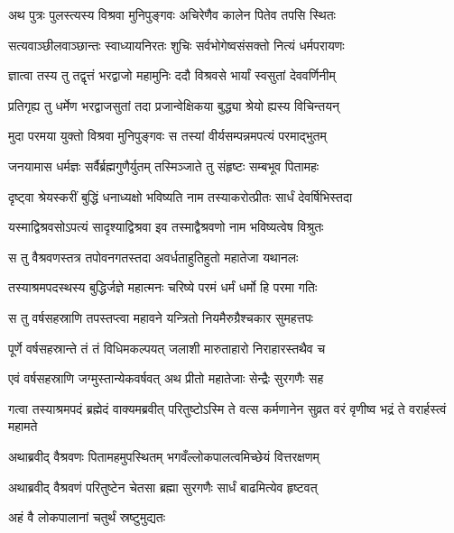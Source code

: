 
\twolineshloka
{अथ पुत्रः पुलस्त्यस्य विश्रवा मुनिपुङ्गवः}
{अचिरेणैव कालेन पितेव तपसि स्थितः} %

\twolineshloka
{सत्यवाञ्छीलवाञ्छान्तः स्वाध्यायनिरतः शुचिः}
{सर्वभोगेष्वसंसक्तो नित्यं धर्मपरायणः} %

\twolineshloka
{ज्ञात्वा तस्य तु तद्वृत्तं भरद्वाजो महामुनिः}
{ददौ विश्रवसे भार्यां स्वसुतां देववर्णिनीम्} %

\twolineshloka
{प्रतिगृह्य तु धर्मेण भरद्वाजसुतां तदा}
{प्रजान्वेक्षिकया बुद्ध्या श्रेयो ह्यस्य विचिन्तयन्} %

\twolineshloka
{मुदा परमया युक्तो विश्रवा मुनिपुङ्गवः}
{स तस्यां वीर्यसम्पन्नमपत्यं परमाद्भुतम्} %

\twolineshloka
{जनयामास धर्मज्ञः सर्वैर्ब्रह्मगुणैर्युतम्}
{तस्मिञ्जाते तु संहृष्टः सम्बभूव पितामहः} %

\twolineshloka
{दृष्ट्वा श्रेयस्करीं बुद्धिं धनाध्यक्षो भविष्यति}
{नाम तस्याकरोत्प्रीतः सार्धं देवर्षिभिस्तदा} %

\twolineshloka
{यस्माद्विश्रवसोऽपत्यं सादृश्याद्विश्रवा इव}
{तस्माद्वैश्रवणो नाम भविष्यत्वेष विश्रुतः} %

\twolineshloka
{स तु वैश्रवणस्तत्र तपोवनगतस्तदा}
{अवर्धताहुतिहुतो महातेजा यथानलः} %

\twolineshloka
{तस्याश्रमपदस्थस्य बुद्धिर्जज्ञे महात्मनः}
{चरिष्ये परमं धर्मं धर्मो हि परमा गतिः} %

\twolineshloka
{स तु वर्षसहस्राणि तपस्तप्त्वा महावने}
{यन्त्रितो नियमैरुग्रैश्चकार सुमहत्तपः} %

\twolineshloka
{पूर्णे वर्षसहस्रान्ते तं तं विधिमकल्पयत्}
{जलाशी मारुताहारो निराहारस्तथैव च} %

\twolineshloka
{एवं वर्षसहस्राणि जग्मुस्तान्येकवर्षवत्}
{अथ प्रीतो महातेजाः सेन्द्रैः सुरगणैः सह} %

\threelineshloka
{गत्वा तस्याश्रमपदं ब्रह्मेदं वाक्यमब्रवीत्}
{परितुष्टोऽस्मि ते वत्स कर्मणानेन सुव्रत}
{वरं वृणीष्व भद्रं ते वरार्हस्त्वं महामते} %

\twolineshloka
{अथाब्रवीद् वैश्रवणः पितामहमुपस्थितम्}
{भगवँल्लोकपालत्वमिच्छेयं वित्तरक्षणम्} %

\twolineshloka
{अथाब्रवीद् वैश्रवणं परितुष्टेन चेतसा}
{ब्रह्मा सुरगणैः सार्धं बाढमित्येव हृष्टवत्} %

\onelineshloka
{अहं वै लोकपालानां चतुर्थं स्रष्टुमुद्यतः} %

